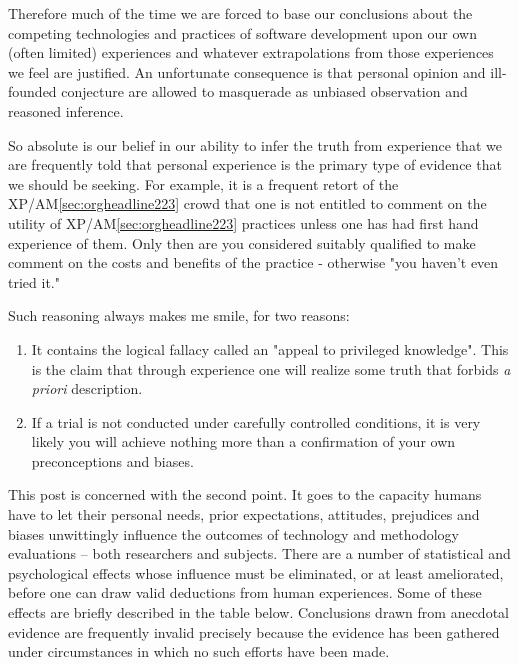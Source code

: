 \documentclass{article}
\begin{document}
Therefore much of the time we are forced to base our conclusions about
the competing technologies and practices of software development upon
our own (often limited) experiences and whatever extrapolations from
those experiences we feel are justified. An unfortunate consequence is
that personal opinion and ill-founded conjecture are allowed to
masquerade as unbiased observation and reasoned inference.

So absolute is our belief in our ability to infer the truth from
experience that we are frequently told that personal experience is the
primary type of evidence that we should be seeking. For example, it is a
frequent retort of the XP/AM\ref{sec:orgheadline223} crowd that one is not entitled to
comment on the utility of XP/AM\ref{sec:orgheadline223} practices unless one has had
first hand experience of them. Only then are you considered suitably
qualified to make comment on the costs and benefits of the practice -
otherwise "you haven't even tried it."

Such reasoning always makes me smile, for two reasons:

\begin{enumerate}
\item It contains the logical fallacy called an "appeal to privileged
knowledge". This is the claim that through experience one will
realize some truth that forbids \emph{a priori} description.\\
\item If a trial is not conducted under carefully controlled conditions, it
is very likely you will achieve nothing more than a confirmation of
your own preconceptions and biases.
\end{enumerate}

This post is concerned with the second point. It goes to the capacity
humans have to let their personal needs, prior expectations, attitudes,
prejudices and biases unwittingly influence the outcomes of technology
and methodology evaluations -- both researchers and subjects. There are
a number of statistical and psychological effects whose influence must
be eliminated, or at least ameliorated, before one can draw valid
deductions from human experiences. Some of these effects are briefly
described in the table below. Conclusions drawn from anecdotal evidence
are frequently invalid precisely because the evidence has been gathered
under circumstances in which no such efforts have been made.
\end{document}
